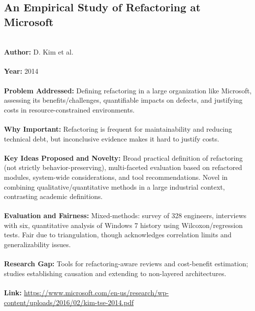 \documentclass[12pt]{article}
\begin{document}
\subsection*{An Empirical Study of Refactoring at Microsoft}
\\
\textbf{Author:} D. Kim et al. \\
\\
\textbf{Year:} 2014 \\
\\
\textbf{Problem Addressed:} Defining refactoring in a large organization like Microsoft, assessing its benefits/challenges, quantifiable impacts on defects, and justifying costs in resource-constrained environments. \\
\\
\textbf{Why Important:} Refactoring is frequent for maintainability and reducing technical debt, but inconclusive evidence makes it hard to justify costs. \\
\\
\textbf{Key Ideas Proposed and Novelty:} Broad practical definition of refactoring (not strictly behavior-preserving), multi-faceted evaluation based on refactored modules, system-wide considerations, and tool recommendations. Novel in combining qualitative/quantitative methods in a large industrial context, contrasting academic definitions. \\
\\
\textbf{Evaluation and Fairness:} Mixed-methods: survey of 328 engineers, interviews with six, quantitative analysis of Windows 7 history using Wilcoxon/regression tests. Fair due to triangulation, though acknowledges correlation limits and generalizability issues. \\
\\
\textbf{Research Gap:} Tools for refactoring-aware reviews and cost-benefit estimation; studies establishing causation and extending to non-layered architectures. \\
\\
\textbf{Link:} \url{https://www.microsoft.com/en-us/research/wp-content/uploads/2016/02/kim-tse-2014.pdf}
\pagebreak

\end{document}
